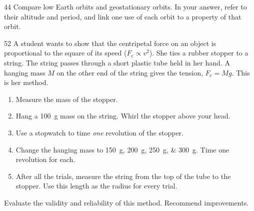 \begin{practiceq}{4}{4}\label{pq:leogeo}
Compare low Earth orbits and geostationary orbits. In your answer, refer to their altitude
and period, and link one use of each orbit to a property of that orbit.
\end{practiceq}

\begin{practiceq}{5}{2}\label{pq:stopper}
A student wants to show that the centripetal force on an object is proportional to the
square of its speed ($F_\mathrm{c} \propto v^2$). She ties a rubber stopper to a string. The
string passes through a short plastic tube held in her hand. A hanging mass $M$ on the other
end of the string gives the tension, $F_\mathrm{c} = Mg$. This is her method.
\begin{enumerate}
  \item Measure the mass of the stopper.
  \item Hang a \qty{100}{g} mass on the string. Whirl the stopper above your head.
  \item Use a stopwatch to time \emph{one} revolution of the stopper.
  \item Change the hanging mass to \qtylist{150;200;250;300}{g}. Time one revolution for each.
  \item After all the trials, measure the string from the top of the tube to the stopper. Use
        this length as the radius for every trial.
\end{enumerate}
Evaluate the validity and reliability of this method. Recommend improvements.
\end{practiceq}

